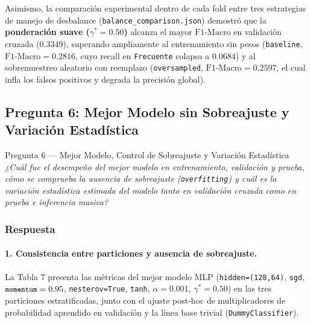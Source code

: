 \documentclass[11pt,a4paper]{article}
\newcommand{\code}[1]{\texttt{\small #1}}
\begin{document}
Asimismo, la comparación experimental dentro de cada fold entre tres estrategias de manejo de desbalance (\code{balance\_comparison.json}) demostró que la \textbf{ponderación suave ($\gamma^* = 0.50$)} alcanza el mayor $\text{F1-Macro}$ en validación cruzada ($\mathbf{0.3349}$), superando ampliamente al entrenamiento sin pesos (\code{baseline}, $\text{F1-Macro} = 0.2816$, cuyo recall en \code{Frecuente} colapsa a $0.0684$) y al sobremuestreo aleatorio con reemplazo (\code{oversampled}, $\text{F1-Macro} = 0.2597$, el cual infla los falsos positivos y degrada la precisión global).

\subsection{Pregunta 6: Mejor Modelo sin Sobreajuste y Variación Estadística}

\begin{pregunta}{Pregunta 6 --- Mejor Modelo, Control de Sobreajuste y Variación Estadística}{}
\textit{¿Cuál fue el desempeño del mejor modelo en entrenamiento, validación y prueba, cómo se comprueba la ausencia de sobreajuste (\texttt{overfitting}) y cuál es la variación estadística estimada del modelo tanto en validación cruzada como en prueba e inferencia masiva?}
\end{pregunta}

\subsubsection*{Respuesta}

\paragraph{1. Consistencia entre particiones y ausencia de sobreajuste.}
La Tabla 7 presenta las métricas del mejor modelo MLP (\code{hidden=(128,64)}, \code{sgd}, $\text{\code{momentum}}=0.95$, \code{nesterov=True}, \code{tanh}, $\alpha=0.001$, $\gamma^*=0.50$) en las tres particiones estratificadas, junto con el ajuste post-hoc de multiplicadores de probabilidad aprendido en validación y la línea base trivial (\code{DummyClassifier}).
\end{document}
